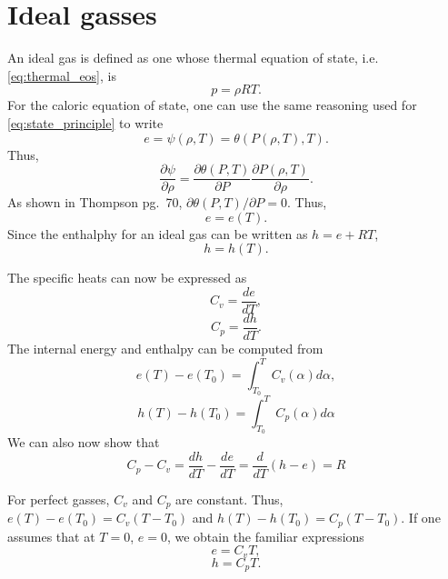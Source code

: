 \documentclass[oneside,a4paper,11pt]{report}
\begin{document}
\section{Ideal gasses}
An ideal gas is defined as one whose thermal equation of state, i.e.\@ \cref{eq:thermal_eos}, is
\begin{equation}
    p = \rho R T.
\end{equation}
For the caloric equation of state, one can use the same reasoning used for \cref{eq:state_principle} to write
\begin{equation}
    e = \psi(\rho,T) = \theta(P(\rho,T),T).
\end{equation}
Thus,
\begin{equation}
    \frac{\partial \psi}{\partial \rho} = \frac{\partial \theta(P,T)}{\partial P} \frac{\partial P(\rho,T)}{\partial \rho}.
\end{equation}
As shown in Thompson pg.\ 70, $\partial \theta(P,T) / \partial P = 0$. Thus, 
\begin{equation}
    e = e(T).
\end{equation}
Since the enthalphy for an ideal gas can be written as $h = e + RT$,
\begin{equation}
    h = h(T).
\end{equation}

The specific heats can now be expressed as
\begin{equation}
    C_v = \frac{de}{dT},
\end{equation}
\begin{equation}
    C_p = \frac{dh}{dT}.
\end{equation}
The internal energy and enthalpy can be computed from
\begin{equation}
    e(T) - e(T_0) = \int_{T_0}^{T} C_v(\alpha) d\alpha,
\end{equation}
\begin{equation}
    h(T) - h(T_0) = \int_{T_0}^{T} C_p(\alpha) d\alpha
\end{equation}
We can also now show that 
\begin{equation}
    C_p - C_v = \frac{dh}{dT} - \frac{de}{dT} = \frac{d}{dT} (h-e) = R
\end{equation}

For perfect gasses, $C_v$ and $C_p$ are constant. Thus, $e(T) - e(T_0) = C_v (T - T_0)$ and $h(T) - h(T_0) = C_p (T - T_0)$. If one assumes that at $T = 0$, $e = 0$, we obtain the familiar expressions
\begin{equation}
    e = C_v T,
\end{equation}
\begin{equation}
    h = C_p T.
\end{equation}
\end{document}
